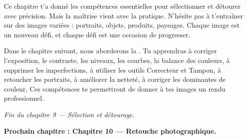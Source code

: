 Ce chapitre t'a donné les compétences essentielles pour sélectionner et détourer avec précision. Mais la maîtrise vient avec la pratique. N'hésite pas à t'entraîner sur des images variées : portraits, objets, produits, paysages. Chaque image est un nouveau défi, et chaque défi est une occasion de progresser.

Dans le chapitre suivant, nous aborderons la . Tu apprendras à corriger l'exposition, le contraste, les niveaux, les courbes, la balance des couleurs, à supprimer les imperfections, à utiliser les outils Correcteur et Tampon, à retoucher les portraits, à améliorer la netteté, à corriger les dominantes de couleur. Ces compétences te permettront de donner à tes images un rendu professionnel.

\vspace{2em}

\begin{center}
\textit{Fin du chapitre 9 --- Sélection et détourage.}

\vspace{1em}

\textbf{Prochain chapitre : Chapitre 10 --- Retouche photographique.}
\end{center}